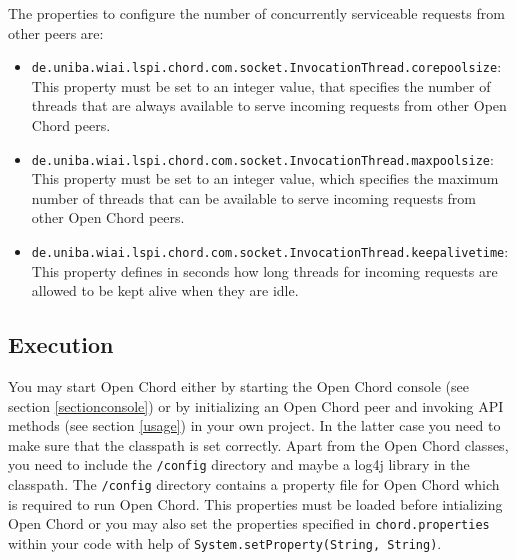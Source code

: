 The properties to configure the number of concurrently serviceable requests from other 
peers are: 
\begin{itemize}
\item {\tt de.uniba.wiai.lspi.chord.com.socket.InvocationThread.corepoolsize}:\\ This 
property must be set to an integer value, that specifies the number of threads that 
are always available to serve incoming requests from other Open Chord peers. 
\item {\tt de.uniba.wiai.lspi.chord.com.socket.InvocationThread.maxpoolsize}:\\ This 
property must be set to an integer value, which specifies the maximum number of threads that can be available to serve incoming requests from other Open Chord peers. 
\item {\tt de.uniba.wiai.lspi.chord.com.socket.InvocationThread.keepalivetime}:\\ This 
property defines in seconds how long threads for incoming requests are allowed to be 
kept alive when they are idle. 
\end{itemize}

\subsection{Execution}\label{execution}
You may start Open Chord either by starting the Open Chord console (see section \ref{sectionconsole}) or by initializing an Open Chord peer and invoking API methods (see section \ref{usage}) in your own project. In the latter case you need to make sure that the classpath is set correctly. Apart from the Open Chord classes, you need to include the {\tt /config} directory and maybe a log4j library in the classpath. The {\tt /config} directory contains a property file for Open Chord which is required to run Open Chord. This properties must be loaded before intializing Open Chord or you may also set the properties specified in {\tt chord.properties} within your code with help of {\tt System.setProperty(String, String)}.